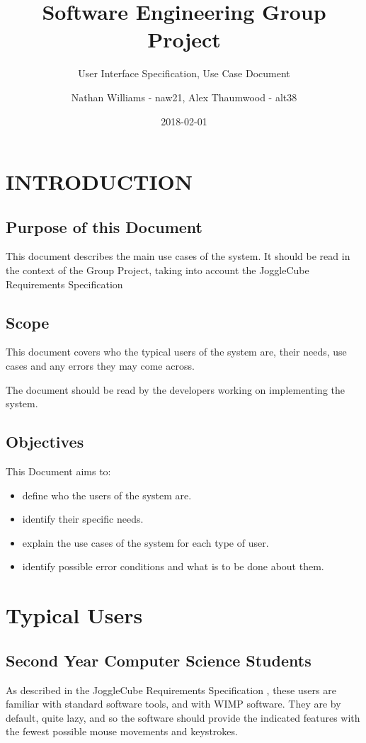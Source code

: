 \documentclass{project}
\begin{document}
\title{Software Engineering Group Project}
\subtitle{User Interface Specification, Use Case Document}
\author{Nathan Williams - naw21, Alex Thaumwood - alt38}     
\date{2018-02-01}
\maketitle
\tableofcontents
\newpage
\section{INTRODUCTION}

\subsection{Purpose of this Document}

This document describes the main use cases of the system. It should be read in the context of the Group Project, taking into account the JoggleCube Requirements Specification \cite{SE.QA.CSRS}

\subsection{Scope}

This document covers who the typical users of the system are, their needs, use cases and any errors they may come across.

The document should be read by the developers working on implementing the system.

\subsection{Objectives}
This Document aims to:
\begin{itemize}
	\item define who the users of the system are.
	\item identify their specific needs.
	\item explain the use cases of the system for each type of user.
	\item identify possible error conditions and what is to be done about them.
\end{itemize}

\section{Typical Users}
\subsection{Second Year Computer Science Students}
	As described in the JoggleCube Requirements Specification \cite{SE.QA.CSRS}, these users are familiar with standard software tools, and with WIMP software. They are by default, quite lazy, and so the software should provide the indicated features with the fewest possible mouse movements and keystrokes.
	
\end{document}
